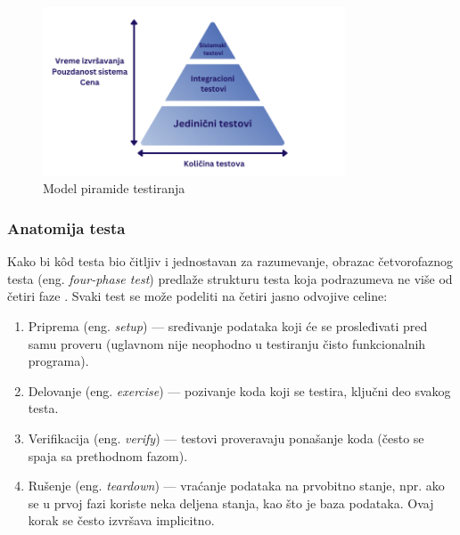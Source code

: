 \documentclass[12pt,oneside]{memoir}
\begin{document}
\begin{figure}[!ht]
  \centering
  \label{fig:piramida}
  \includegraphics[width=0.8\textwidth]{piramidanova.png}
  \caption{Model piramide testiranja}
\end{figure}

\subsubsection{Anatomija testa}
\par Kako bi k\^{o}d testa bio čitljiv i jednostavan za razumevanje, obrazac četvorofaznog testa (eng. \emph{four-phase test}) predlaže strukturu testa koja podrazumeva ne više od četiri faze \cite{4phase}. Svaki test se može podeliti na četiri jasno odvojive celine:  
\begin{enumerate}
\item Priprema (eng. \emph{setup}) --- sređivanje podataka koji će se prosleđivati pred samu proveru (uglavnom nije neophodno u testiranju čisto funkcionalnih programa).
\item Delovanje (eng. \emph{exercise}) --- pozivanje koda koji se testira, ključni deo svakog testa.
\item Verifikacija (eng. \emph{verify}) --- testovi proveravaju ponašanje koda (često se spaja sa prethodnom fazom). 
\item Rušenje (eng. \emph{teardown}) --- vraćanje podataka na prvobitno stanje, npr. ako se u prvoj fazi koriste neka deljena stanja, kao što je baza podataka. Ovaj korak se često izvršava implicitno. 
\end{enumerate}
\end{document}
